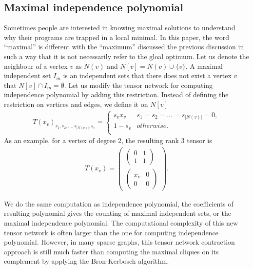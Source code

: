 \documentclass[review,onefignum,onetabnum]{siamart190516}
\newcommand{\<}{\langle}
\renewcommand{\>}{\rangle}
\newcounter{example}
\begin{document}
\subsection{Maximal independence polynomial}
Sometimes people are interested in knowing maximal solutions to understand why their programs are trapped in a local minimal.
In this paper, the word ``maximal'' is different with the ``maximum'' discussed the previous discussion in such a way that it is not necessarily refer to the gloal optimum.
Let us denote the neighbour of a vertex $v$ as $N(v)$ and $N[v] = N(v)\cup \{v\}$.
A maximal independent set $I_m$ is an independent sets that there does not exist a vertex $v$ that $N[v] \cap I_m = \emptyset$.
Let us modify the tensor network for computing independence polynomial by adding this restriction.
Instead of defining the restriction on vertices and edges, we define it on $N[v]$
\begin{align}
    T(x_v)_{s_1,s_2,\ldots,s_{|N(v)|},s_v} = \begin{cases}
        s_vx_v & s_1=s_2=\ldots=s_{|N(v)|}=0,\\
        1-s_v& otherwise.\\
    \end{cases}
\end{align}
As an example, for a vertex of degree 2, the resulting rank 3 tensor is
\begin{align}
    T(x_v)=\left(\begin{matrix}
    \left(\begin{matrix}
        0 &1 \\
        1 &1
    \end{matrix}\right)\\
    \left(\begin{matrix}
        x_v &0 \\
        0 &0
    \end{matrix}\right)
    \end{matrix}\right).
\end{align}

We do the same computation as independence polynomial, the coefficients of resulting polynomial gives the counting of maximal independent sets, or the maximal independence polynomial.
The computational complexity of this new tensor network is often larger than the one for computing independence polynomial.
However, in many sparse graphs, this tensor network contraction approach is still much faster than computing the maximal cliques on its complement by applying the Bron-Kerbosch algorithm.
\end{document}
